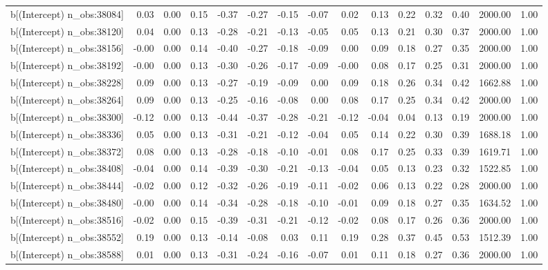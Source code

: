 \begin{table}[ht]
\begin{tabular}{rrrrrrrrrrrrrrr}
  b[(Intercept) n\_obs:38084] & 0.03 & 0.00 & 0.15 & -0.37 & -0.27 & -0.15 & -0.07 & 0.02 & 0.13 & 0.22 & 0.32 & 0.40 & 2000.00 & 1.00 \\ 
  b[(Intercept) n\_obs:38120] & 0.04 & 0.00 & 0.13 & -0.28 & -0.21 & -0.13 & -0.05 & 0.05 & 0.13 & 0.21 & 0.30 & 0.37 & 2000.00 & 1.00 \\ 
  b[(Intercept) n\_obs:38156] & -0.00 & 0.00 & 0.14 & -0.40 & -0.27 & -0.18 & -0.09 & 0.00 & 0.09 & 0.18 & 0.27 & 0.35 & 2000.00 & 1.00 \\ 
  b[(Intercept) n\_obs:38192] & -0.00 & 0.00 & 0.13 & -0.30 & -0.26 & -0.17 & -0.09 & -0.00 & 0.08 & 0.17 & 0.25 & 0.31 & 2000.00 & 1.00 \\ 
  b[(Intercept) n\_obs:38228] & 0.09 & 0.00 & 0.13 & -0.27 & -0.19 & -0.09 & 0.00 & 0.09 & 0.18 & 0.26 & 0.34 & 0.42 & 1662.88 & 1.00 \\ 
  b[(Intercept) n\_obs:38264] & 0.09 & 0.00 & 0.13 & -0.25 & -0.16 & -0.08 & 0.00 & 0.08 & 0.17 & 0.25 & 0.34 & 0.42 & 2000.00 & 1.00 \\ 
  b[(Intercept) n\_obs:38300] & -0.12 & 0.00 & 0.13 & -0.44 & -0.37 & -0.28 & -0.21 & -0.12 & -0.04 & 0.04 & 0.13 & 0.19 & 2000.00 & 1.00 \\ 
  b[(Intercept) n\_obs:38336] & 0.05 & 0.00 & 0.13 & -0.31 & -0.21 & -0.12 & -0.04 & 0.05 & 0.14 & 0.22 & 0.30 & 0.39 & 1688.18 & 1.00 \\ 
  b[(Intercept) n\_obs:38372] & 0.08 & 0.00 & 0.13 & -0.28 & -0.18 & -0.10 & -0.01 & 0.08 & 0.17 & 0.25 & 0.33 & 0.39 & 1619.71 & 1.00 \\ 
  b[(Intercept) n\_obs:38408] & -0.04 & 0.00 & 0.14 & -0.39 & -0.30 & -0.21 & -0.13 & -0.04 & 0.05 & 0.13 & 0.23 & 0.32 & 1522.85 & 1.00 \\ 
  b[(Intercept) n\_obs:38444] & -0.02 & 0.00 & 0.12 & -0.32 & -0.26 & -0.19 & -0.11 & -0.02 & 0.06 & 0.13 & 0.22 & 0.28 & 2000.00 & 1.00 \\ 
  b[(Intercept) n\_obs:38480] & -0.00 & 0.00 & 0.14 & -0.34 & -0.28 & -0.18 & -0.10 & -0.01 & 0.09 & 0.18 & 0.27 & 0.35 & 1634.52 & 1.00 \\ 
  b[(Intercept) n\_obs:38516] & -0.02 & 0.00 & 0.15 & -0.39 & -0.31 & -0.21 & -0.12 & -0.02 & 0.08 & 0.17 & 0.26 & 0.36 & 2000.00 & 1.00 \\ 
  b[(Intercept) n\_obs:38552] & 0.19 & 0.00 & 0.13 & -0.14 & -0.08 & 0.03 & 0.11 & 0.19 & 0.28 & 0.37 & 0.45 & 0.53 & 1512.39 & 1.00 \\ 
  b[(Intercept) n\_obs:38588] & 0.01 & 0.00 & 0.13 & -0.31 & -0.24 & -0.16 & -0.07 & 0.01 & 0.11 & 0.18 & 0.27 & 0.36 & 2000.00 & 1.00 \\ 

\end{tabular}
\end{table}
